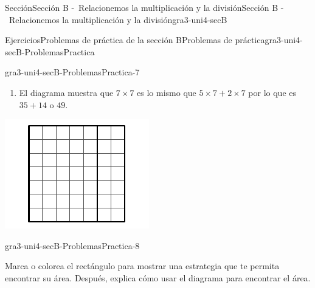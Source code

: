 \documentclass[oneside,10pt,]{article}
\begin{document}
\begin{sectionptx}{Sección}{Sección B -~Relacionemos la multiplicación y la división}{}{Sección B -~Relacionemos la multiplicación y la división}{}{}{gra3-uni4-secB}
\begin{exercises-subsection}{Ejercicios}{Problemas de práctica de la sección B}{}{Problemas de práctica}{}{}{gra3-uni4-secB-ProblemasPractica}
\begin{divisionexercise}{5}{}{}{gra3-uni4-secB-ProblemasPractica-7}
\begin{sidebyside}{2}{0}{0}{0}
\begin{sbspanel}{0.6}
\begin{enumerate}[label={(\alph*)}]
\item{}El diagrama muestra que \(7 \times 7\) es lo mismo que \(5 \times 7 + 2 \times 7\) por lo que es \(35 + 14\) o \(49\).%
\end{enumerate}
\end{sbspanel}%
\begin{sbspanel}{0.4}%
\includegraphics[width=\linewidth]{external/svg-source/tikz-file-152439.pdf}
\end{sbspanel}%
\end{sidebyside}%
\end{divisionexercise}%
\begin{divisionexercise}{6}{}{}{gra3-uni4-secB-ProblemasPractica-8}%
\begin{sidebyside}{2}{0}{0}{0}%
\begin{sbspanel}{0.6}%
Marca o colorea el rectángulo para mostrar una estrategia que te permita encontrar su área. Después, explica cómo usar el diagrama para encontrar el área.%
\end{sbspanel}%
\begin{sbspanel}{0.4}%

\end{sbspanel}
\end{sidebyside}
\end{divisionexercise}
\end{exercises-subsection}
\end{sectionptx}
\end{document}
